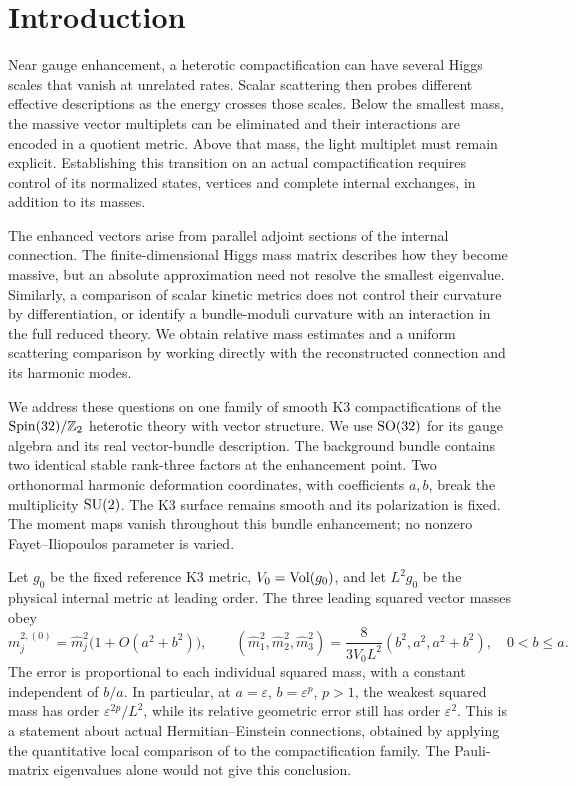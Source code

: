 \section{Introduction}\label{sec:introduction}

Near gauge enhancement, a heterotic compactification can have several
Higgs scales that vanish at unrelated rates. Scalar scattering then probes
different effective descriptions as the energy crosses those scales.
Below the smallest mass, the massive vector multiplets can be eliminated
and their interactions are encoded in a quotient metric. Above that mass,
the light multiplet must remain explicit. Establishing this transition
on an actual compactification requires control of its normalized states,
vertices and complete internal exchanges, in addition to its masses.

The enhanced vectors arise from parallel adjoint sections of the internal
connection. The finite-dimensional Higgs mass matrix describes how they
become massive, but an absolute approximation need not resolve the smallest
eigenvalue. Similarly, a comparison of scalar kinetic metrics does not
control their curvature by differentiation, or identify a bundle-moduli
curvature with an interaction in the full reduced theory. We obtain
relative mass estimates and a uniform scattering comparison by working
directly with the reconstructed connection and its harmonic modes.

We address these questions on one family of smooth K3 compactifications of
the $\operatorname{Spin}(32)/\mathbb Z_2$ heterotic theory with vector structure.
We use $\operatorname{SO}(32)$ for its gauge algebra and its real vector-bundle
description. The background bundle contains two identical stable
rank-three factors at the enhancement point. Two orthonormal harmonic
deformation coordinates, with coefficients $a,b$, break the multiplicity
$\operatorname{SU}(2)$. The K3 surface remains smooth and its polarization is fixed.
The moment maps vanish throughout this bundle enhancement; no nonzero
Fayet--Iliopoulos parameter is varied.

Let $g_0$ be the fixed reference K3 metric, $V_0=\operatorname{Vol}(g_0)$, and let
$L^2g_0$ be the physical internal metric at leading order. The three leading
squared vector masses obey
\begin{equation}\label{eq:intro-masses}
 m_j^{2,(0)}=\widehat m_j^2\bigl(1+O(a^2+b^2)\bigr),\qquad
 (\widehat m_1^2,\widehat m_2^2,\widehat m_3^2)
 =\frac{8}{3V_0L^2}(b^2,a^2,a^2+b^2),\quad 0<b\le a.
\end{equation}
The error is proportional to each individual squared mass, with a
constant independent of $b/a$. In particular, at
$a=\varepsilon$, $b=\varepsilon^p$, $p>1$, the weakest squared mass
has order $\varepsilon^{2p}/L^2$, while its relative geometric error
still has order $\varepsilon^2$. This is a statement about actual
Hermitian--Einstein connections, obtained by applying the quantitative
local comparison of \cite{wuebben15} to the compactification family.
The Pauli-matrix eigenvalues alone would not give this conclusion.

